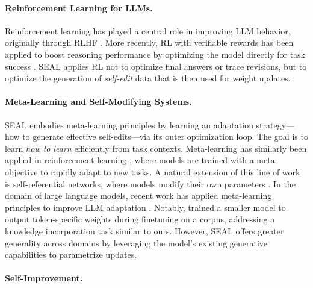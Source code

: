 \documentclass{article}
\newcommand{\methodacronym}{SEAL\xspace}
\begin{document}
\paragraph{Reinforcement Learning for LLMs.}
Reinforcement learning has played a central role in improving LLM behavior, originally through RLHF \citep{ouyang2022rlhf}. More recently, RL with verifiable rewards has been applied to boost reasoning performance by optimizing the model directly for task success \citep{zelikman2022starbootstrappingreasoningreasoning, singh2023beyond,deepseekai2025r1}. \methodacronym applies RL not to optimize final answers or trace revisions, but to optimize the generation of \textit{self-edit} data that is then used for weight updates. 

\paragraph{Meta-Learning and Self-Modifying Systems.} \methodacronym embodies meta-learning principles \citep{schmidhuber1987meta,hochreiter2001learning,finn2017maml} by learning an adaptation strategy---how to generate effective self-edits---via its outer optimization loop. The goal is to learn \textit{how to learn} efficiently from task contexts. Meta-learning has similarly been applied in reinforcement learning \citep{duan2016rl,wang2016learning,frans2017meta,gupta2018meta, sun2025text}, where models are trained with a meta-objective to rapidly adapt to new tasks. A natural extension of this line of work is self-referential networks, where models modify their own parameters \citet{schmidhuber1992steps, irie2022modern}. In the domain of large language models, recent work has applied meta-learning principles to improve LLM adaptation \citep{tan2023massive, hu2023metalearningonlineadaptationlanguage}. Notably, \citet{hu2023metalearningonlineadaptationlanguage} trained a smaller model to output token-specific weights during finetuning on a corpus, addressing a knowledge incorporation task similar to ours. However, \methodacronym offers greater generality across domains by leveraging the model's existing generative capabilities to parametrize updates.

\paragraph{Self-Improvement.}
\end{document}
